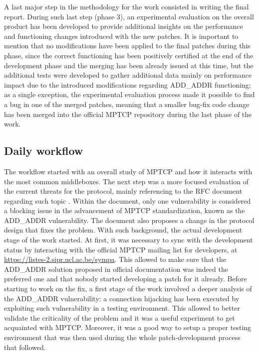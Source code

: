 A last major step in the methodology for the work consisted in writing the final report. During such last step (phase 3), an experimental evaluation on the overall product has been developed to provide additional insights on the performance and functioning changes introduced with the new patches. It is important to mention that no modifications have been applied to the final patches during this phase, since the correct functioning has been positively certified at the end of the development phase and the merging has been already issued at this time, but the additional tests were developed to gather additional data mainly on performance impact due to the introduced modifications regarding ADD\_ADDR functioning; as a single exception, the experimental evaluation process made it possible to find a bug in one of the merged patches, meaning that a smaller bug-fix code change has been merged into the official MPTCP repository during the last phase of the work.

\subsection{Daily workflow}
The workflow started with an overall study of MPTCP and how it interacts with the most common middleboxes. The next step was a more focused evaluation of the current threats for the protocol, mainly referencing to the RFC document regarding such topic \cite{rfc7430}. Within the document, only one vulnerability is considered a blocking issue in the advancement of MPTCP standardization, known as the ADD\_ADDR vulnerability. The document also proposes a change in the protocol design that fixes the problem. With such background, the actual development stage of the work started. At first, it was necessary to sync with the development status by interacting with the official MPTCP mailing list for developers, at \url{https://listes-2.sipr.ucl.ac.be/sympa}. This allowed to make sure that the ADD\_ADDR solution proposed in official documentation \cite{rfc7430} was indeed the preferred one and that nobody started developing a patch for it already.
Before starting to work on the fix, a first stage of the work involved a deeper analysis of the ADD\_ADDR vulnerability: a connection hijacking has been executed by exploiting such vulnerability in a testing environment. This allowed to better validate the criticality of the problem and it was a useful experiment to get acquainted with MPTCP. Moreover, it was a good way to setup a proper testing environment that was then used during the whole patch-development process that followed.

